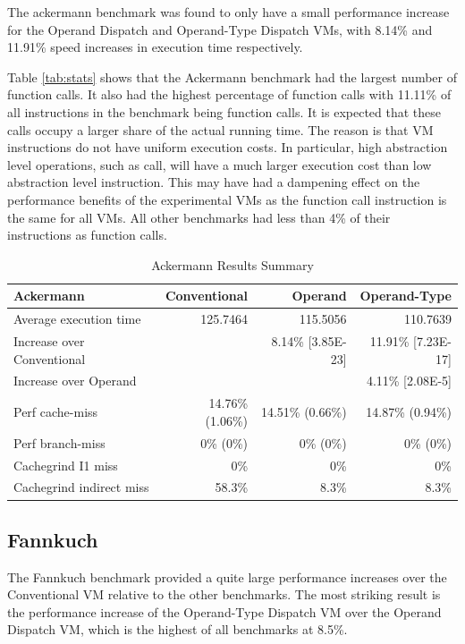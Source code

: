 \documentclass[english,a4paper,12pt]{report}
\begin{document}
The ackermann benchmark was found to only have a small performance
increase for the Operand Dispatch and Operand-Type Dispatch VMs, with
8.14\% and 11.91\% speed increases in execution time respectively.

Table \ref{tab:stats} shows that the Ackermann benchmark had the
largest number of function calls. It also had the highest percentage
of function calls with 11.11\% of all instructions in the benchmark
being function calls. It is expected that these calls occupy a larger
share of the actual running time. The reason is that VM instructions
do not have uniform execution costs. In particular, high abstraction
level operations, such as call, will have a much larger execution cost
than low abstraction level instruction. This may have had a dampening
effect on the performance benefits of the experimental VMs as the
function call instruction is the same for all VMs. All other
benchmarks had less than 4\% of their instructions as function calls.

\begin{table}[!htb]
  \begin{center}
    \begin{tabular}{lrrr}
      Ackermann & Conventional & Operand & Operand-Type\\
      \hline
      Average execution time & 125.7464 & 115.5056 & 110.7639\\
      Increase over Conventional &  & 8.14\% [3.85E-23] & 11.91\% [7.23E-17]\\
      Increase over Operand &  &  & 4.11\% [2.08E-5]\\
      Perf cache-miss & 14.76\% (1.06\%) & 14.51\% (0.66\%) & 14.87\% (0.94\%)\\
      Perf branch-miss & 0\% (0\%) & 0\% (0\%) & 0\% (0\%)\\
      Cachegrind I1 miss & 0\% & 0\% & 0\%\\
      Cachegrind indirect miss & 58.3\% & 8.3\% & 8.3\%\\
    \end{tabular}
  \end{center}
  \caption{Ackermann Results Summary}
\end{table}


\subsection{Fannkuch}
The Fannkuch benchmark provided a quite large performance increases
over the Conventional VM relative to the other benchmarks. The most
striking result is the performance increase of the Operand-Type
Dispatch VM over the Operand Dispatch VM, which is the highest of all
benchmarks at 8.5\%.
\end{document}
